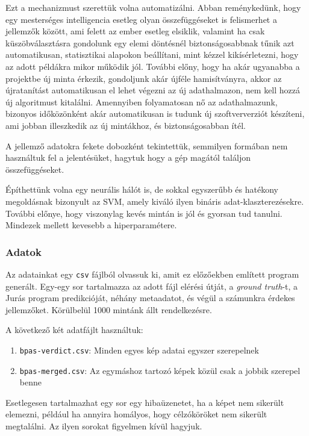 Ezt a mechanizmust szerettük volna automatizálni. Abban reménykedünk, hogy egy 
mesterséges intelligencia esetleg olyan összefüggéseket is felismerhet a jellemzők
között, ami felett az ember esetleg elsiklik, valamint ha csak küszöbválasztásra
gondolunk egy elemi döntésnél biztonságosabbnak tűnik azt automatikusan, statisztikai
alapokon beállítani, mint kézzel kikísérletezni, hogy az adott példákra mikor működik jól.
További előny, hogy ha akár ugyanabba a projektbe új minta érkezik, gondoljunk akár újféle 
hamisítványra, akkor az újratanítást automatikusan el lehet végezni az új adathalmazon,
nem kell hozzá új algoritmust kitalálni. Amennyiben folyamatosan nő az adathalmazunk, 
bizonyos időközönként akár automatikusan is tudunk új szoftververziót készíteni,
ami jobban illeszkedik az új mintákhoz, és biztonságosabban ítél.


A jellemző adatokra fekete dobozként tekintettük, semmilyen formában nem használtuk fel
a jelentésüket, hagytuk hogy a gép magától találjon összefüggéseket.


Építhettünk volna egy neurális hálót is, de sokkal egyszerűbb és hatékony
megoldásnak bizonyult az SVM, amely kiváló ilyen bináris adat-klaszterezésekre.
További előnye, hogy viszonylag kevés mintán is jól és gyorsan tud tanulni.
Mindezek mellett kevesebb a hiperparamétere.


\subsubsection{Adatok}
\label{sec:adatok}

Az adatainkat egy \texttt{csv} fájlból olvassuk ki, amit ez előzőekben említett program 
generált. Egy-egy sor tartalmazza az adott fájl elérési útját, a \textit{ground truth}-t,
a Jurás program predikcióját, néhány metaadatot, és végül a számunkra érdekes jellemzőket.
Körülbelül 1000 mintánk állt rendelkezésre.

\noindent
A következő két adatfájlt használtuk:

\begin{enumerate}
\item
	\texttt{bpas-verdict.csv}: Minden egyes kép adatai egyszer szerepelnek
\item
	\texttt{bpas-merged.csv}: Az egymáshoz tartozó képek közül csak a jobbik szerepel benne
\end{enumerate}

Esetlegesen tartalmazhat egy sor egy hibaüzenetet, ha a képet nem sikerült elemezni, például 
ha annyira homályos, hogy célzóköröket nem sikerült megtalálni. Az ilyen sorokat figyelmen kívül hagyjuk.


